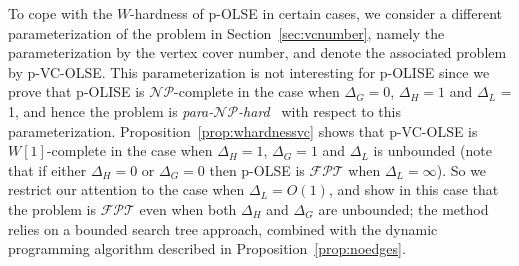\documentclass[11pt]{article}
\newcommand{\NP}{\mbox{$\mathcal{NP}$}}
\newcommand{\FPT}{\text{$\mathcal{FPT}$}}
\begin{document}
To cope with the $W$-hardness of p-OLSE in certain cases, we consider a different parameterization of the problem in Section~\ref{sec:vcnumber}, namely the parameterization by the vertex cover number, and denote the associated problem by p-VC-OLSE. This parameterization is not interesting for p-OLISE since we prove that p-OLISE is \NP-complete in the case when $\Delta_G=0$, $\Delta_H=1$ and $\Delta_L$ = 1, and hence the problem is {\em para-\NP-hard}~\cite{grohebook} with respect to this parameterization. Proposition~\ref{prop:whardnessvc} shows that p-VC-OLSE is $W[1]$-complete in the case when $\Delta_H=1$, $\Delta_G=1$ and $\Delta_L$ is unbounded (note that if either $\Delta_H=0$ or $\Delta_G=0$ then p-OLSE is $\FPT$ when $\Delta_L = \infty$). So we restrict our attention to the case when $\Delta_L=O(1)$, and show in this case that the problem is $\FPT$ even when both $\Delta_H$ and $\Delta_G$ are unbounded; the method relies on a bounded search tree approach, combined with the dynamic programming algorithm described in Proposition~\ref{prop:noedges}.
\end{document}
